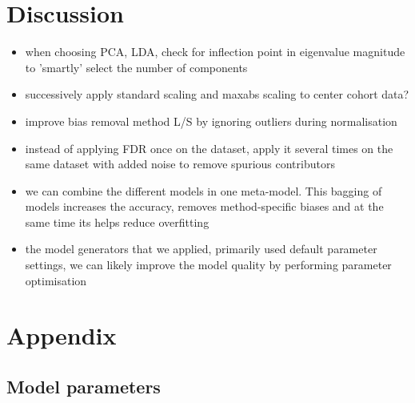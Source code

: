 \documentclass[a4paper,10pt]{article}
\begin{document}
\section{Discussion}

\begin{itemize}
\item when choosing PCA, LDA, check for inflection point in eigenvalue magnitude to 'smartly' select the number of components
\item successively apply standard scaling and maxabs scaling to center cohort data?
\item improve bias removal method L/S by ignoring outliers during normalisation
\item instead of applying FDR once on the dataset, apply it several times on the same dataset with added noise to remove spurious contributors
\item we can combine the different models in one meta-model. This bagging of models increases the accuracy, removes method-specific biases and at the same time its helps reduce overfitting
\item the model generators that we applied, primarily used default parameter settings, we can likely improve the model quality by performing parameter optimisation
\end{itemize}

\section*{Appendix}
\subsection*{Model parameters}
\end{document}
